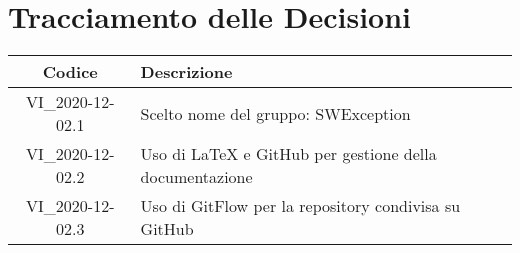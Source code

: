 \section*{Tracciamento delle Decisioni}

\begin{center}
	\begin{longtable}{|c|p{14.5cm}|}
	\hline
	\rowcolor{lighter-grayer}
	\textbf{Codice} & \textbf{Descrizione} \\
	\hline
	\endfirsthead

	\hline
	VI\_2020-12-02.1 & Scelto nome del gruppo: SWException \\
	VI\_2020-12-02.2 & Uso di LaTeX e GitHub per gestione della documentazione \\
	VI\_2020-12-02.3 & Uso di GitFlow per la repository condivisa su GitHub\\
	\hline

	\end{longtable}
\end{center}